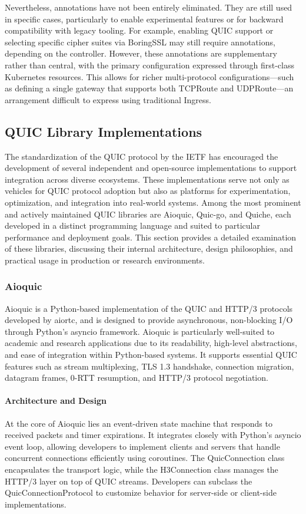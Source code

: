 Nevertheless, annotations have not been entirely eliminated. They are still used in specific cases, particularly to enable experimental features or for backward compatibility with legacy tooling. For example, enabling QUIC support or selecting specific cipher suites via BoringSSL may still require annotations, depending on the controller. However, these annotations are supplementary rather than central, with the primary configuration expressed through first-class Kubernetes resources. This allows for richer multi-protocol configurations—such as defining a single gateway that supports both TCPRoute and UDPRoute—an arrangement difficult to express using traditional Ingress.


\subsection{QUIC Library Implementations}
The standardization of the QUIC protocol by the IETF has encouraged the development of several independent and open-source implementations to support integration across diverse ecosystems. These implementations serve not only as vehicles for QUIC protocol adoption but also as platforms for experimentation, optimization, and integration into real-world systems. Among the most prominent and actively maintained QUIC libraries are Aioquic, Quic-go, and Quiche, each developed in a distinct programming language and suited to particular performance and deployment goals. This section provides a detailed examination of these libraries, discussing their internal architecture, design philosophies, and practical usage in production or research environments.

\subsubsection{Aioquic}
Aioquic is a Python-based implementation of the QUIC and HTTP/3 protocols developed by aiortc, and is designed to provide asynchronous, non-blocking I/O through Python's asyncio framework. Aioquic is particularly well-suited to academic and research applications due to its readability, high-level abstractions, and ease of integration within Python-based systems. It supports essential QUIC features such as stream multiplexing, TLS 1.3 handshake, connection migration, datagram frames, 0-RTT resumption, and HTTP/3 protocol negotiation.

\paragraph{Architecture and Design}
At the core of Aioquic lies an event-driven state machine that responds to received packets and timer expirations. It integrates closely with Python's asyncio event loop, allowing developers to implement clients and servers that handle concurrent connections efficiently using coroutines. The QuicConnection class encapsulates the transport logic, while the H3Connection class manages the HTTP/3 layer on top of QUIC streams. Developers can subclass the QuicConnectionProtocol to customize behavior for server-side or client-side implementations.

